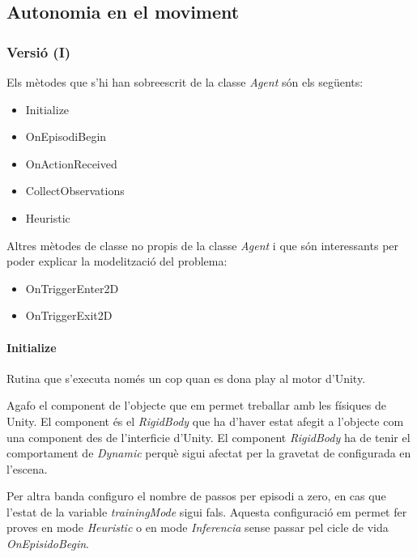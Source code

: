 \documentclass{article}
\begin{document}
    \subsection{ Autonomia en el moviment }
    
    \subsubsection{ Versió (I) }
    
   Els mètodes que s'hi han sobreescrit de la classe \textit{Agent} són els següents:
    
    \begin{itemize}
        \item Initialize
        \item OnEpisodiBegin
        \item OnActionReceived
        \item CollectObservations
        \item Heuristic
    \end{itemize}
    
    Altres mètodes de classe no propis de la classe \textit{Agent} i que són interessants per poder explicar la modelització del problema:
    
    \begin{itemize}
        \item OnTriggerEnter2D
        \item OnTriggerExit2D
    \end{itemize}
    
    \paragraph{Initialize}
    
   Rutina que s'executa només un cop quan es dona play al motor d'Unity.

    Agafo el component de l'objecte que em permet treballar amb les físiques de Unity. El component és el \textit{RigidBody} que ha d'haver estat afegit a l'objecte com una component des de l'interficie d'Unity. El component \textit{RigidBody} ha de tenir el comportament de \textit{Dynamic} perquè sigui afectat per la gravetat de configurada en l'escena.
    
    Per altra banda configuro el nombre de passos per episodi a zero, en cas que l'estat de la variable \textit{trainingMode} sigui fals. Aquesta configuració em permet fer proves en mode \textit{Heuristic} o en mode \textit{Inferencia} sense passar pel cicle de vida \textit{OnEpisidoBegin}.
    
\end{document}
